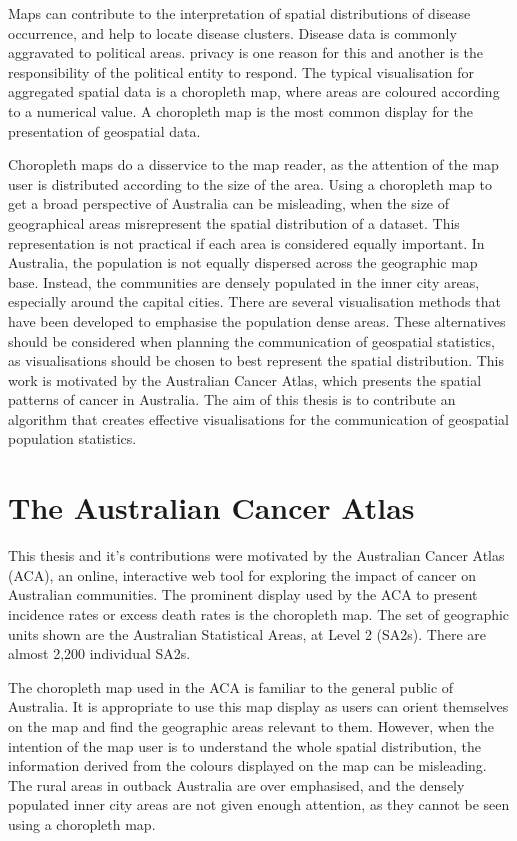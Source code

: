 \documentclass{monashthesis}
\begin{document}
Maps can contribute to the interpretation of spatial distributions of disease occurrence, and help to locate disease clusters. Disease data is commonly aggravated to political areas. privacy is one reason for this and another is the responsibility of the political entity to respond. The typical visualisation for aggregated spatial data is a choropleth map, where areas are coloured according to a numerical value. A choropleth map is the most common display for the presentation of geospatial data.

Choropleth maps do a disservice to the map reader, as the attention of the map user is distributed according to the size of the area. Using a choropleth map to get a broad perspective of Australia can be misleading, when the size of geographical areas misrepresent the spatial distribution of a dataset. This representation is not practical if each area is considered equally important. In Australia, the population is not equally dispersed across the geographic map base.
Instead, the communities are densely populated in the inner city areas, especially around the capital cities. There are several visualisation methods that have been developed to emphasise the population dense areas. These alternatives should be considered when planning the communication of geospatial statistics, as visualisations should be chosen to best represent the spatial distribution. This work is motivated by the Australian Cancer Atlas, which presents the spatial patterns of cancer in Australia. The aim of this thesis is to contribute an algorithm that creates effective visualisations for the communication of geospatial population statistics.

\hypertarget{the-australian-cancer-atlas}{%
\section{The Australian Cancer Atlas}\label{the-australian-cancer-atlas}}

This thesis and it's contributions were motivated by the Australian Cancer Atlas (ACA), an online, interactive web tool for exploring the impact of cancer on Australian communities. The prominent display used by the ACA to present incidence rates or excess death rates is the choropleth map. The set of geographic units shown are the Australian Statistical Areas, at Level 2 (SA2s). There are almost 2,200 individual SA2s.

The choropleth map used in the ACA is familiar to the general public of Australia. It is appropriate to use this map display as users can orient themselves on the map and find the geographic areas relevant to them.
However, when the intention of the map user is to understand the whole spatial distribution, the information derived from the colours displayed on the map can be misleading.
The rural areas in outback Australia are over emphasised, and the densely populated inner city areas are not given enough attention, as they cannot be seen using a choropleth map.
\end{document}
